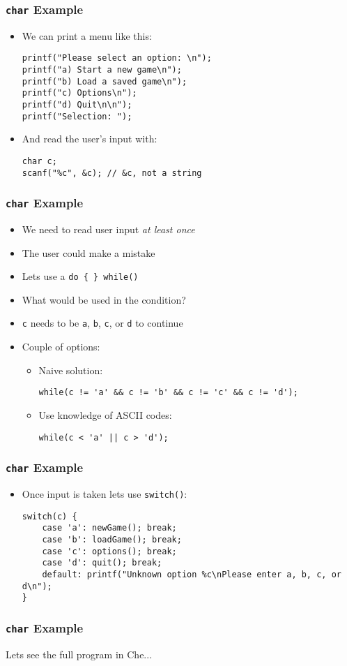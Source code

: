 \documentclass[14pt]{beamer}
\begin{document}
\begin{frame}[fragile]
\frametitle{\texttt{char} Example}
\begin{itemize}
\item We can print a menu like this:
\begin{lstlisting}[style=CStyle]
printf("Please select an option: \n");
printf("a) Start a new game\n");
printf("b) Load a saved game\n");
printf("c) Options\n");
printf("d) Quit\n\n");
printf("Selection: ");
\end{lstlisting}
\pause
\item And read the user's input with:
\begin{lstlisting}[style=CStyle]
char c;
scanf("%c", &c); // &c, not a string
\end{lstlisting}
\end{itemize}
\end{frame}

\begin{frame}[fragile]
\frametitle{\texttt{char} Example}
\begin{itemize}
\item We need to read user input \textit{at least once}
\item The user could make a mistake
\item Lets use a \texttt{do \{ \} while()}
\pause
\item What would be used in the condition?
\pause
\item \texttt{c} needs to be \texttt{a}, \texttt{b}, \texttt{c}, or \texttt{d} to continue
\pause
\item Couple of options:
	\begin{itemize}
		\item Naive solution:
\begin{lstlisting}[style=CStyle]
while(c != 'a' && c != 'b' && c != 'c' && c != 'd');
\end{lstlisting}
		\item Use knowledge of ASCII codes:
\begin{lstlisting}[style=CStyle]
while(c < 'a' || c > 'd');
\end{lstlisting}
	\end{itemize}
\end{itemize}
\end{frame}

\begin{frame}[fragile]
\frametitle{\texttt{char} Example}
\begin{itemize}
\item Once input is taken lets use \texttt{switch()}:
\begin{lstlisting}[style=CStyle]
switch(c) {
	case 'a': newGame(); break;
	case 'b': loadGame(); break;
	case 'c': options(); break;
	case 'd': quit(); break;
	default: printf("Unknown option %c\nPlease enter a, b, c, or d\n");
}
\end{lstlisting}
\end{itemize}
\end{frame}

\begin{frame}
\frametitle{\texttt{char} Example}
\begin{center}
Lets see the full program in Che...
\end{center}
\end{frame}
\end{document}
